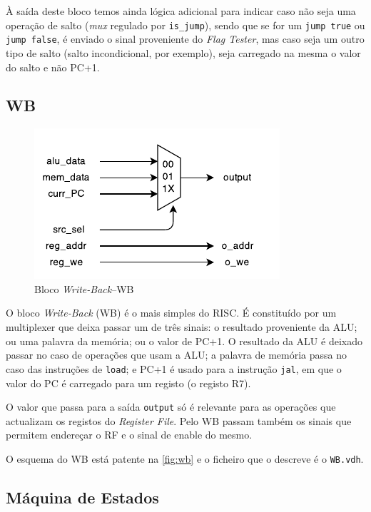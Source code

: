 \documentclass[a4paper]{article}
\begin{document}
				À saída deste bloco temos ainda lógica adicional para indicar caso não seja uma operação de salto (\textit{mux} regulado por \texttt{is\_jump}), sendo que se for um \texttt{jump true} ou \texttt{jump false}, é enviado o sinal proveniente do \emph{Flag Tester}, mas caso seja um outro tipo de salto (salto incondicional, por exemplo), seja carregado na mesma o valor do salto e não PC+1.
			
				
		\subsection{WB}
		
			\begin{figure}[H]
				\centering
				\includegraphics[width=.8\textwidth]{img/WB}
				\caption{Bloco \textit{Write-Back}--WB}
				\label{fig:wb}
			\end{figure}
			
			O bloco \textit{Write-Back} (WB) é o mais simples do \textmu RISC. É constituído por um multiplexer que deixa passar um de três sinais: o resultado proveniente da ALU; ou uma palavra da memória; ou o valor de PC+1. O resultado da ALU é deixado passar no caso de operações que usam a ALU; a palavra de memória passa no caso das instruções de \texttt{load}; e PC+1 é usado para a instrução \texttt{jal}, em que o valor do PC é carregado para um registo (o registo R7).
			
			O valor que passa para a saída \texttt{output} só é relevante para as operações que actualizam os registos do \textit{Register File}. Pelo WB passam também os sinais que permitem endereçar o RF e o sinal de enable do mesmo.
			
			O esquema do WB está patente na \autoref{fig:wb} e o ficheiro que o descreve é o \texttt{WB.vdh}.
			

		\subsection{Máquina de Estados}
		\label{subsec:maqestados}
		
\end{document}
